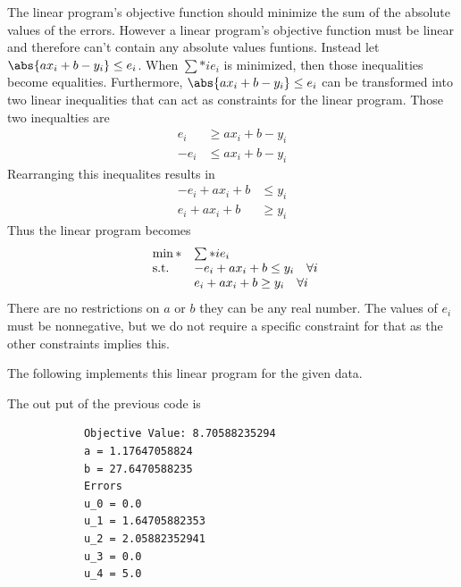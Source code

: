 \documentclass[11pt, oneside]{article}
\begin{document}
\begin{enumerate}
        The linear program's objective function should minimize the sum of the
        absolute values of the errors.
        However a linear program's objective function must be linear and
        therefore can't contain any absolute values funtions.
        Instead let $\abs{a x_i + b - y_i} \le e_i$.
        When $\sum*{i}{}{e_i}$ is minimized, then those inequalities become
        equalities.
        Furthermore, $\abs{a x_i + b - y_i} \le e_i$ can be transformed into two
        linear inequalities that can act as constraints for the linear program.
        Those two inequalties are
        \begin{align*}
             e_i &\ge a x_i + b - y_i \\
            -e_i &\le a x_i + b - y_i
        \end{align*}
        Rearranging this inequalites results in
        \begin{align*}
            -e_i + a x_i + b &\le y_i \\
             e_i + a x_i + b &\ge y_i
        \end{align*}
        Thus the linear program becomes
        \[
            \begin{array}{ll@{}ll}
                \min* & \sum*{i}{}{e_i} \\
                \text{s.t.} & -e_i + a x_i + b \le y_i \quad \forall i \\
                            &  e_i + a x_i + b \ge y_i \quad \forall i
            \end{array}
        \]
        There are no restrictions on $a$ or $b$ they can be any real number.
        The values of $e_i$ must be nonnegative, but we do not require a
        specific constraint for that as the other constraints implies this.

        The following implements this linear program for the given data.
        

        The out put of the previous code is
        \begin{verbatim}
            Objective Value: 8.70588235294
            a = 1.17647058824
            b = 27.6470588235
            Errors
            u_0 = 0.0
            u_1 = 1.64705882353
            u_2 = 2.05882352941
            u_3 = 0.0
            u_4 = 5.0
        \end{verbatim}


\end{enumerate}
\end{document}
